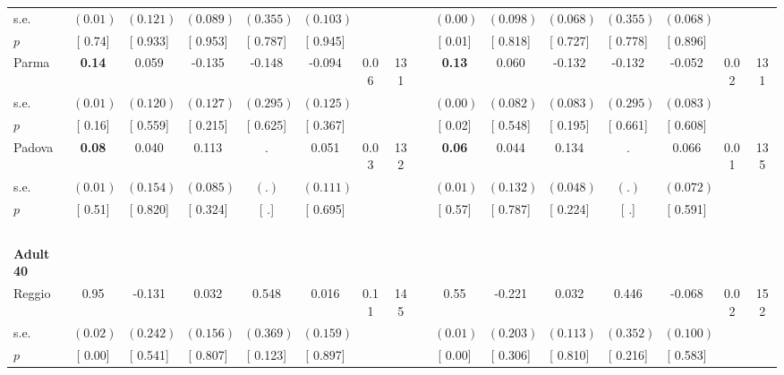 \begin{longtable}{L{8em} c c c c c c c p{1em} c c c c c c c}
\quad \quad \quad \quad s.e.& $ (     0.01)$ & $ (    0.121)$ & $ (    0.089)$ & $ (    0.355)$ & $ (    0.103)$ & & & & $ (     0.00)$ & $ (    0.098)$ & $ (    0.068)$ & $ (    0.355)$ & $ (    0.068)$ & &  \\*
\quad \quad \quad \quad $ p$ & [     0.74] & [    0.933] & [    0.953] & [    0.787] & [    0.945] & & & & [     0.01] & [    0.818] & [    0.727] & [    0.778] & [    0.896] & &  \\[1em]
\quad \quad \quad Parma& \textbf{     0.14} &     0.059 &    -0.135 &    -0.148 &    -0.094 &      0.06 &       131 & & \textbf{     0.13} &     0.060 &    -0.132 &    -0.132 &    -0.052 &      0.02 &       131  \\*
\quad \quad \quad \quad s.e.& $ (     0.01)$ & $ (    0.120)$ & $ (    0.127)$ & $ (    0.295)$ & $ (    0.125)$ & & & & $ (     0.00)$ & $ (    0.082)$ & $ (    0.083)$ & $ (    0.295)$ & $ (    0.083)$ & &  \\*
\quad \quad \quad \quad $ p$ & [     0.16] & [    0.559] & [    0.215] & [    0.625] & [    0.367] & & & & [     0.02] & [    0.548] & [    0.195] & [    0.661] & [    0.608] & &  \\[1em]
\quad \quad \quad Padova& \textbf{     0.08} &     0.040 &     0.113 &         . &     0.051 &      0.03 &       132 & & \textbf{     0.06} &     0.044 &     0.134 &         . &     0.066 &      0.01 &       135  \\*
\quad \quad \quad \quad s.e.& $ (     0.01)$ & $ (    0.154)$ & $ (    0.085)$ & $ (        .)$ & $ (    0.111)$ & & & & $ (     0.01)$ & $ (    0.132)$ & $ (    0.048)$ & $ (        .)$ & $ (    0.072)$ & &  \\*
\quad \quad \quad \quad $ p$ & [     0.51] & [    0.820] & [    0.324] & [        .] & [    0.695] & & & & [     0.57] & [    0.787] & [    0.224] & [        .] & [    0.591] & &  \\[1em]
~\\[1em]
\quad \quad \textbf{Adult 40} & & & & & & & & & & & & & & & \\* 
\quad \quad \quad Reggio& 0.95 &    -0.131 &     0.032 &     0.548 &     0.016 &      0.11 &       145 & & 0.55 &    -0.221 &     0.032 &     0.446 &    -0.068 &      0.02 &       152  \\*
\quad \quad \quad \quad s.e.& $ (     0.02)$ & $ (    0.242)$ & $ (    0.156)$ & $ (    0.369)$ & $ (    0.159)$ & & & & $ (     0.01)$ & $ (    0.203)$ & $ (    0.113)$ & $ (    0.352)$ & $ (    0.100)$ & &  \\*
\quad \quad \quad \quad $ p$ & [     0.00] & [    0.541] & [    0.807] & [    0.123] & [    0.897] & & & & [     0.00] & [    0.306] & [    0.810] & [    0.216] & [    0.583] & &  \\[1em]

\end{longtable}
